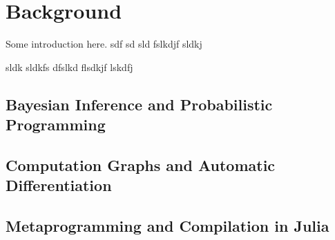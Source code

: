 \chapter{Background}
\label{cha:background}

Some introduction here. sdf sd sld fslkdjf sldkj

sldk sldkfs dfslkd flsdkjf lskdfj

\section{Bayesian Inference and Probabilistic Programming}
\label{sec:bayes-infer-prob}

\section{Computation Graphs and Automatic Differentiation}
\label{sec:graph-track-autom}

\section{Metaprogramming and Compilation in Julia}
\label{sec:metapr-comp-julia}


